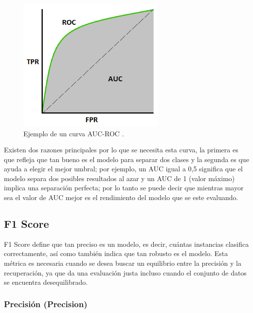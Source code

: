 \begin{figure}[h!]
  \begin{center}	\includegraphics[width=0.65\textwidth]{imagenes/Cap4/auc_roc}
  \caption{Ejemplo de un curva AUC-ROC \cite{62}.}
  \label{fig:auc_roc}
  \end{center}
\end{figure}


\vspace{5mm} %

Existen dos razones principales por lo que se necesita esta curva, la primera es que refleja que tan bueno es el modelo para separar dos clases y la segunda es que ayuda a elegir el mejor umbral; por ejemplo, un AUC igual a 0,5 significa que el modelo separa dos posibles resultados al azar y un AUC de 1 (valor m\'{a}ximo) implica una separaci\'{o}n perfecta; por lo tanto se puede decir que mientras mayor sea el valor de AUC mejor es el rendimiento del modelo que se este evaluando.

\subsection{F1 Score}

F1 Score define que tan preciso es un modelo, es decir, cu\'{a}ntas instancias clasifica correctamente, as\'{i} como tambi\'{e}n indica que tan robusto es el modelo. Esta m\'{e}trica es necesaria cuando se desea buscar un equilibrio entre la precisi\'{o}n y la recuperaci\'{o}n, ya que da una evaluaci\'{o}n justa incluso cuando el conjunto de datos se encuentra desequilibrado.

\subsubsection{Precisi\'{o}n (Precision)}

